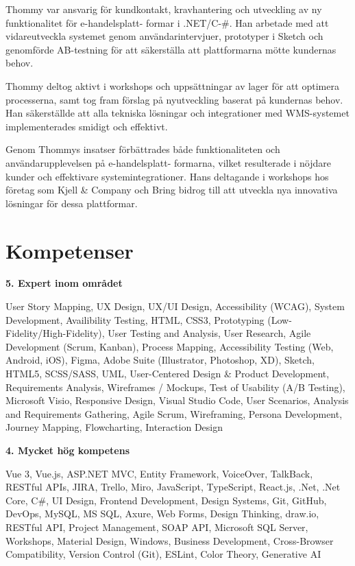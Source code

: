 \documentclass[a4paper,10pt]{article}
\begin{document}
Thommy var ansvarig för kundkontakt, kravhantering och utveckling av ny funktionalitet för e-handelsplatt-
formar i .NET/C-\#. Han arbetade med att vidareutveckla systemet genom användarintervjuer, prototyper i Sketch och genomförde AB-testning för att säkerställa att plattformarna mötte kundernas behov.

Thommy deltog aktivt i workshops och uppsättningar av lager för att optimera processerna, samt tog fram förslag på nyutveckling baserat på kundernas behov. Han säkerställde att alla tekniska lösningar och integrationer med WMS-systemet implementerades smidigt och effektivt.

Genom Thommys insatser förbättrades både funktionaliteten och användarupplevelsen på e-handelsplatt-
formarna, vilket resulterade i nöjdare kunder och effektivare systemintegrationer. Hans deltagande i workshops hos företag som Kjell \& Company och Bring bidrog till att utveckla nya innovativa lösningar för dessa plattformar.

\vspace{0.5cm}

\section*{Kompetenser}

\textbf{5. Expert inom området}

User Story Mapping, UX Design, UX/UI Design, Accessibility (WCAG), System Development, Availibility Testing, HTML, CSS3, Prototyping (Low-Fidelity/High-Fidelity), User Testing and Analysis, User Research, Agile Development (Scrum, Kanban), Process Mapping, Accessibility Testing (Web, Android, iOS), Figma, Adobe Suite (Illustrator, Photoshop, XD), Sketch, HTML5, SCSS/SASS, UML, User-Centered Design \& Product Development, Requirements Analysis, Wireframes / Mockups, Test of Usability (A/B Testing), Microsoft Visio, Responsive Design, Visual Studio Code, User Scenarios, Analysis and Requirements Gathering, Agile Scrum, Wireframing, Persona Development, Journey Mapping, Flowcharting, Interaction Design
\vspace{0.3cm}

\textbf{4. Mycket hög kompetens}

Vue 3, Vue.js, ASP.NET MVC, Entity Framework, VoiceOver, TalkBack, RESTful APIs, JIRA, Trello, Miro, JavaScript, TypeScript, React.js, .Net, .Net Core, C\#, UI Design, Frontend Development, Design Systems, Git, GitHub, DevOps, MySQL, MS SQL, Axure, Web Forms, Design Thinking, draw.io, RESTful API, Project Management, SOAP API, Microsoft SQL Server, Workshops, Material Design, Windows, Business Development, Cross-Browser Compatibility, Version Control (Git), ESLint, Color Theory, Generative AI
\vspace{0.5cm}
\end{document}
